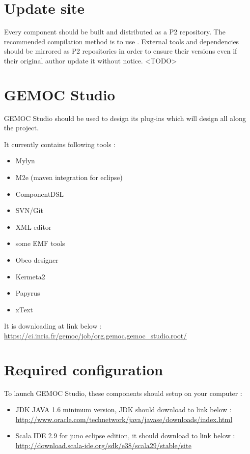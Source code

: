 \documentclass{gemoc} %
\begin{document}
\section{Update site}
Every component should be built and distributed as a P2 repository. The recommended compilation method is to use .
\newline
External tools and dependencies should be mirrored as P2 repositories in order to ensure their versions even if their original author update it without notice.
\newline
\textless TODO\textgreater
\section{GEMOC Studio}
GEMOC Studio should be used to design its plug-ins which will design all along the project.

It currently contains following tools :
\begin{itemize}
	\item Mylyn
	\item M2e (maven integration for eclipse)
	\item ComponentDSL
	\item SVN/Git
	\item XML editor
	\item some EMF tools
	\item Obeo designer
	\item Kermeta2
	\item Papyrus
	\item xText
\end{itemize}
It is downloading at link below :
\newline
\url {https://ci.inria.fr/gemoc/job/org.gemoc.gemoc_studio.root/}
\section{Required configuration}
To launch GEMOC Studio, these components should setup on your computer :
\begin{itemize}
	\item JDK JAVA 1.6 minimum version, JDK should download to link below :
	\newline
	\url {http://www.oracle.com/technetwork/java/javase/downloads/index.html}
	\item Scala IDE 2.9 for juno eclipse edition, it should download to link below :
	\newline
	\url {http://download.scala-ide.org/sdk/e38/scala29/stable/site}
\end{itemize}
\end{document}
